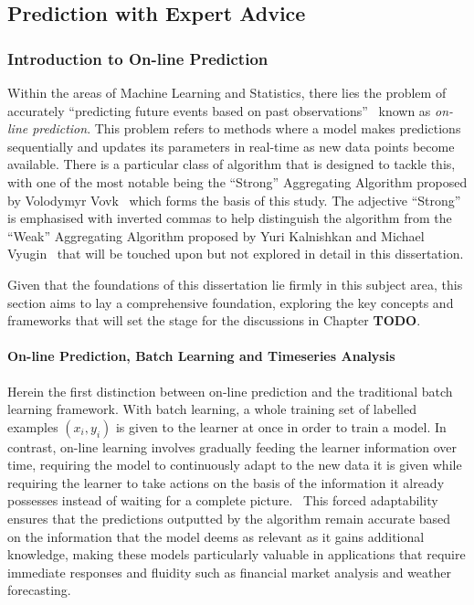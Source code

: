 \subsection{Prediction with Expert Advice}
\subsubsection{Introduction to On-line Prediction}

\noindent Within the areas of Machine Learning and Statistics, there lies the problem of accurately ``predicting future events based on past observations''~\cite{cesa-bianchi:1997}  known as \textit{on-line prediction}. This problem refers to methods where a model makes predictions sequentially and updates its parameters in real-time as new data points become available. There is a particular class of algorithm that is designed to tackle this, with one of the most notable being the ``Strong'' Aggregating Algorithm proposed by Volodymyr Vovk~\cite{vovk:1990} which forms the basis of this study. The adjective ``Strong'' is emphasised with inverted commas to help distinguish the algorithm from the ``Weak'' Aggregating Algorithm proposed by Yuri Kalnishkan and Michael Vyugin~\cite{kalnishkan/vyugin:2008} that will be touched upon but not explored in detail in this dissertation.

Given that the foundations of this dissertation lie firmly in this subject area, this section aims to lay a comprehensive foundation, exploring the key concepts and frameworks that will set the stage for the discussions in Chapter \textbf{TODO}.

\paragraph*{On-line Prediction, Batch Learning and Timeseries Analysis}
Herein the first distinction between on-line prediction and the traditional batch learning framework. With batch learning, a whole training set of labelled examples $(x_i, y_i)$ is given to the learner at once in order to train a model. In contrast, on-line learning involves gradually feeding the learner information over time, requiring the model to continuously adapt to the new data it is given while requiring the learner to take actions on the basis of the information it already possesses instead of waiting for a complete picture.~\cite{kalnishkan:2015} This forced adaptability ensures that the predictions outputted by the algorithm remain accurate based on the information that the model deems as relevant as it gains additional knowledge, making these models particularly valuable in applications that require immediate responses and fluidity such as financial market analysis and weather forecasting.

